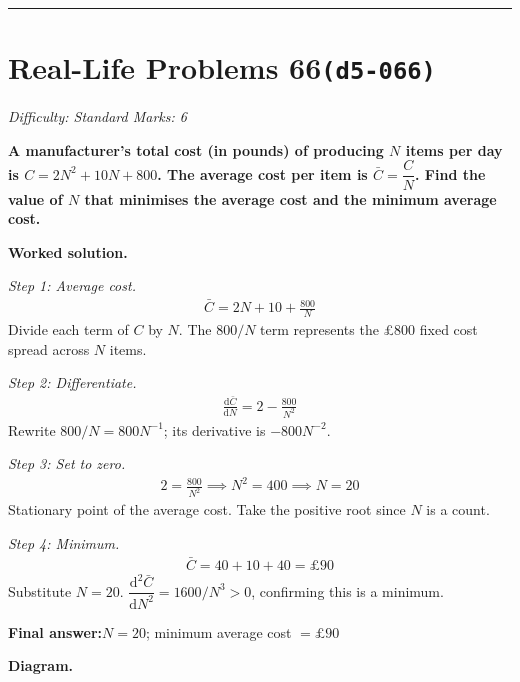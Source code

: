 \documentclass[11pt]{article}
\newcommand{\question}[1]{\par\medskip\noindent\textbf{#1}\par}
\begin{document}
\medskip\hrule

\section*{Real-Life Problems 66\quad\small\texttt{(d5-066)}}
\textit{Difficulty: Standard \quad\textbar\quad Marks: 6}

\question{A manufacturer's total cost (in pounds) of producing \( N \) items per day is \( C = 2N^2 + 10N + 800 \). The average cost per item is \( \bar{C} = \dfrac{C}{N} \). Find the value of \( N \) that minimises the average cost and the minimum average cost.}

\textbf{Worked solution.}

\textit{Step 1: Average cost.}
\[\begin{gathered}
\bar{C} = 2N + 10 + \frac{800}{N}
\end{gathered}\]
Divide each term of \( C \) by \( N \). The \( 800/N \) term represents the \pounds 800 fixed cost spread across \( N \) items.

\textit{Step 2: Differentiate.}
\[\begin{gathered}
\frac{\mathrm{d}\bar{C}}{\mathrm{d}N} = 2 - \frac{800}{N^2}
\end{gathered}\]
Rewrite \( 800/N = 800 N^{-1} \); its derivative is \( -800 N^{-2} \).

\textit{Step 3: Set to zero.}
\[\begin{gathered}
2 = \frac{800}{N^2} \implies N^2 = 400 \implies N = 20
\end{gathered}\]
Stationary point of the average cost. Take the positive root since \( N \) is a count.

\textit{Step 4: Minimum.}
\[\begin{gathered}
\bar{C} = 40 + 10 + 40 = \pounds 90
\end{gathered}\]
Substitute \( N = 20 \). \( \dfrac{\mathrm{d}^2 \bar{C}}{\mathrm{d}N^2} = 1600/N^3 > 0 \), confirming this is a minimum.

\begin{answerbox}
\textbf{Final answer:}\quad \(\displaystyle  N = 20 \); minimum average cost \(\displaystyle  = \pounds 90 \)
\end{answerbox}
\textbf{Diagram.}
\end{document}
